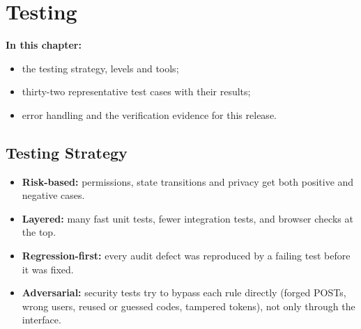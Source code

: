 \documentclass[12pt,a4paper,oneside]{report}
\begin{document}
\chapter{Testing}
\textbf{In this chapter:}
\begin{itemize}[beginpenalty=10000]
  \item the testing strategy, levels and tools;
  \item thirty-two representative test cases with their results;
  \item error handling and the verification evidence for this release.
\end{itemize}

\section{Testing Strategy}
\begin{itemize}
  \item \textbf{Risk-based:} permissions, state transitions and privacy get both positive and negative cases.
  \item \textbf{Layered:} many fast unit tests, fewer integration tests, and browser checks at the top.
  \item \textbf{Regression-first:} every audit defect was reproduced by a failing test before it was fixed.
  \item \textbf{Adversarial:} security tests try to bypass each rule directly (forged POSTs, wrong users, reused or guessed codes, tampered tokens), not only through the interface.
\end{itemize}
\end{document}
